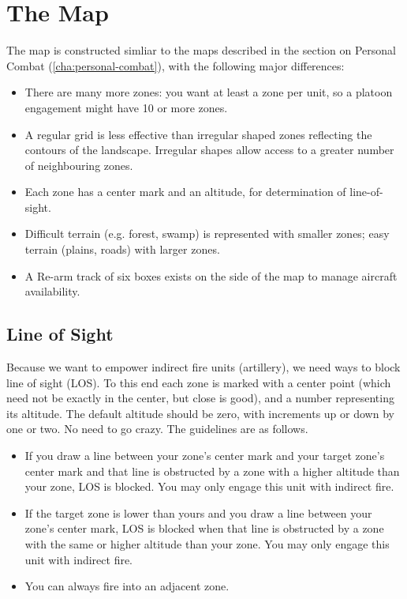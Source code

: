 \section{The Map}\label{sec:platoon-combat-map}

The map is constructed simliar to the maps described in the section on Personal Combat (\autoref{cha:personal-combat}), with the following major differences:

\begin{itemize}
\item
There are many more zones: you want at least a zone per unit, so a platoon engagement might have 10 or more zones.

\item
A regular grid is less effective than irregular shaped zones reflecting the contours of the landscape. Irregular shapes allow access to a greater number of neighbouring zones.

\item
Each zone has a center mark and an altitude, for determination of line-of-sight.

\item
Difficult terrain (e.g. forest, swamp) is represented with smaller zones; easy terrain (plains, roads) with larger zones.

\item
A Re-arm track of six boxes exists on the side of the map to manage aircraft availability.
\end{itemize}



\subsection{Line of Sight}\label{sec:line-of-sight}

Because we want to empower indirect fire units (artillery), we need ways to block line of sight (LOS). To this end each zone is marked with a center point (which need not be exactly in the center, but close is good), and a number representing its altitude. The default altitude should be zero, with increments up or down by one or two. No need to go crazy. The guidelines are as follows.

\begin{itemize}
\item
If you draw a line between your zone's center mark and your target zone's center mark and that line is obstructed by a zone with a higher altitude than your zone, LOS is blocked. You may only engage this unit with indirect fire.

\item
If the target zone is lower than yours and you draw a line between your zone's center mark, LOS is blocked when that line is obstructed by a zone with the same or higher altitude than your zone. You may only engage this unit with indirect fire.
\item
You can always fire into an adjacent zone.
\end{itemize}

